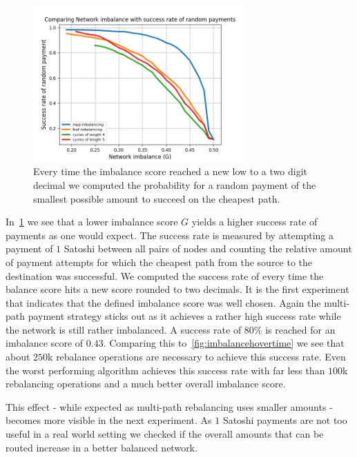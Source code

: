 \documentclass[conference]{IEEEtran}
\begin{document}
\begin{figure}
 \centering
 \includegraphics[width=8cm]{code/vs/fig/imba_vs_success_rates.png}
 \caption{Every time the imbalance score reached a new low to a two digit decimal we computed the probability for a random payment of the smallest possible amount to succeed on the cheapest path.}
 \label{fig:imba_vs_success}
\end{figure}

In~\cref{fig:imba_vs_success} we see that a lower imbalance score $G$ yields a higher success rate of payments as one would expect.
The success rate is measured by attempting a payment of $1$ Satoshi between all pairs of nodes and counting the relative amount of payment attempts for which the cheapest path from the source to the destination was successful.
We computed the success rate of every time the balance score hits a new score rounded to two decimals.
It is the first experiment that indicates that the defined imbalance score was well chosen. 
Again the multi-path payment strategy sticks out as it achieves a rather high success rate while the network is still rather imbalanced.
A success rate of $80\%$ is reached for an imbalance score of $0.43$.
Comparing this to~\cref{fig:imbalancehovertime} we see that about $250$k rebalance operations are necessary to achieve this success rate.
Even the worst performing algorithm achieves this success rate with far less than $100$k rebalancing operations and a much better overall imbalance score. 

This effect - while expected as multi-path rebalancing uses smaller amounts - becomes more visible in the next experiment.
As $1$ Satoshi payments are not too useful in a real world setting we checked if the overall amounts that can be routed increase in a better balanced network.
\end{document}
